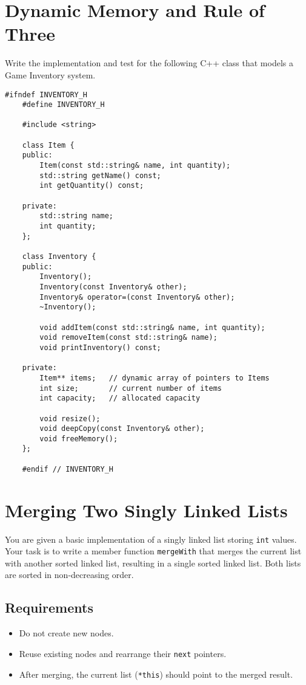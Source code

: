 \documentclass{article}
\begin{document}
\section{Dynamic Memory and Rule of Three}
Write the implementation and test for the following C++ class that models a Game Inventory system.
\begin{lstlisting}[style=cppstyle]
	#ifndef INVENTORY_H
	#define INVENTORY_H
	
	#include <string>
	
	class Item {
	public:
		Item(const std::string& name, int quantity);
		std::string getName() const;
		int getQuantity() const;
	
	private:
		std::string name; 
		int quantity;
	};
	
	class Inventory {
	public:
		Inventory();
		Inventory(const Inventory& other);
		Inventory& operator=(const Inventory& other);
		~Inventory();
	
		void addItem(const std::string& name, int quantity);
		void removeItem(const std::string& name);
		void printInventory() const;
	
	private:
		Item** items;   // dynamic array of pointers to Items
		int size;       // current number of items
		int capacity;   // allocated capacity
	
		void resize();
		void deepCopy(const Inventory& other);
		void freeMemory();
	};
	
	#endif // INVENTORY_H
\end{lstlisting}

\section{Merging Two Singly Linked Lists}

You are given a basic implementation of a singly linked list storing \texttt{int} values. Your task is to write a member function \texttt{mergeWith} that merges the current list with another sorted linked list, resulting in a single sorted linked list. Both lists are sorted in non-decreasing order.

\subsection*{Requirements}
\begin{itemize}
  \item Do not create new nodes.
  \item Reuse existing nodes and rearrange their \texttt{next} pointers.
  \item After merging, the current list (\texttt{*this}) should point to the merged result.
\end{itemize}
\end{document}
